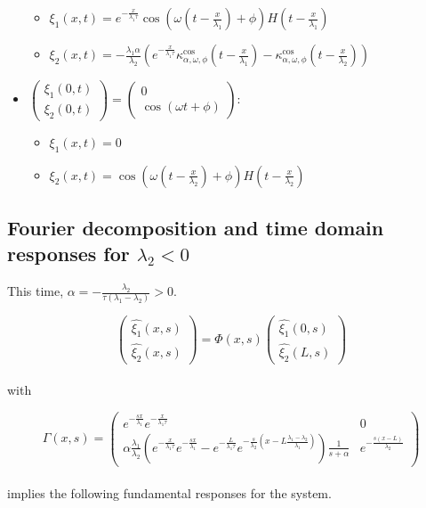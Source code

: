 \documentclass[preprint]{elsarticle}
\begin{document}
\begin{itemize}
\begin{itemize}
\item $\xi_{1}\left(x,t\right)=e^{-\frac{x}{\lambda_{1}\tau}}\cos\left(\omega\left(t-\frac{x}{\lambda_{1}}\right)+\phi\right)H\left(t-\frac{x}{\lambda_{1}}\right)$
\item $\xi_{2}\left(x,t\right)=-\frac{\lambda_{1}\alpha}{\lambda_{2}}\left(e^{-\frac{x}{\lambda_{1}\tau}}\kappa_{\alpha,\omega,\phi}^{\text{cos}}\left(t-\frac{x}{\lambda_{1}}\right)-\kappa_{\alpha,\omega,\phi}^{\text{cos}}\left(t-\frac{x}{\lambda_{2}}\right)\right)$
\end{itemize}
\item $\left(\begin{array}{c}
\xi_{1}\left(0,t\right)\\
\xi_{2}\left(0,t\right)
\end{array}\right)=\left(\begin{array}{c}
0\\
\cos\left(\omega t+\phi\right)
\end{array}\right)$:

\begin{itemize}
\item $\xi_{1}\left(x,t\right)=0$
\item $\xi_{2}\left(x,t\right)=\cos\left(\omega\left(t-\frac{x}{\lambda_{2}}\right)+\phi\right)H\left(t-\frac{x}{\lambda_{2}}\right)$
\end{itemize}
\end{itemize}

\subsection{Fourier decomposition and time domain responses for $\lambda_{2}<0$}

This time, $\alpha=-\frac{\lambda_{2}}{\tau\left(\lambda_{1}-\lambda_{2}\right)}>0$.

\[
\left(\begin{array}{c}
\widehat{\xi_{1}}\left(x,s\right)\\
\widehat{\xi_{2}}\left(x,s\right)
\end{array}\right)=\Phi\left(x,s\right)\left(\begin{array}{c}
\widehat{\xi_{1}}\left(0,s\right)\\
\widehat{\xi_{2}}\left(L,s\right)
\end{array}\right)
\]
\\
with

\[
\varGamma\left(x,s\right)=\left(\begin{array}{cc}
e^{-\frac{sx}{\lambda_{1}}}e^{-\frac{x}{\lambda_{1}\tau}} & 0\\
\alpha\frac{\lambda_{1}}{\lambda_{2}}\left(e^{-\frac{x}{\lambda_{1}\tau}}e^{-\frac{sx}{\lambda_{1}}}-e^{-\frac{L}{\lambda_{1}\tau}}e^{-\frac{s}{\lambda_{2}}\left(x-L\frac{\lambda_{1}-\lambda_{2}}{\lambda_{1}}\right)}\right)\frac{1}{s+\alpha} & e^{-\frac{s\left(x-L\right)}{\lambda_{2}}}
\end{array}\right)
\]
\\
implies the following fundamental responses for the system.
\end{document}
